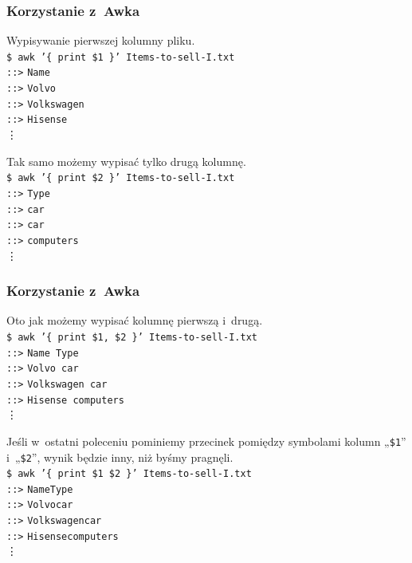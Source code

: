 \documentclass[10pt,t]{beamer}
\begin{document}
\begin{frame}
  \frametitle{Korzystanie z~Awka}


  Wypisywanie pierwszej kolumny pliku. \\
  \texttt{\$ awk '\{ print \$1 \}' Items-to-sell-I.txt} \\
  \texttt{::>} \texttt{Name} \\
  \texttt{::>} \texttt{Volvo} \\
  \texttt{::>} \texttt{Volkswagen} \\
  \texttt{::>} \texttt{Hisense} \\
  \hspace{3em} \vdots

  Tak samo możemy wypisać tylko drugą kolumnę. \\
  \texttt{\$ awk '\{ print \$2 \}' Items-to-sell-I.txt} \\
  \texttt{::>} \texttt{Type} \\
  \texttt{::>} \texttt{car} \\
  \texttt{::>} \texttt{car} \\
  \texttt{::>} \texttt{computers} \\
  \hspace{3em} \vdots

\end{frame}





\begin{frame}
  \frametitle{Korzystanie z~Awka}


  Oto jak możemy wypisać kolumnę pierwszą i~drugą. \\
  \texttt{\$ awk '\{ print \$1, \$2 \}' Items-to-sell-I.txt} \\
  \texttt{::>} \texttt{Name Type} \\
  \texttt{::>} \texttt{Volvo car} \\
  \texttt{::>} \texttt{Volkswagen car} \\
  \texttt{::>} \texttt{Hisense computers} \\
  \hspace{3em} \vdots

  Jeśli w~ostatni poleceniu pominiemy przecinek pomiędzy symbolami kolumn
  „\texttt{\$1}” i~„\texttt{\$2}”, wynik będzie inny, niż byśmy pragnęli. \\
  \texttt{\$ awk '\{ print \$1 \$2 \}' Items-to-sell-I.txt} \\
  \texttt{::>} \texttt{NameType} \\
  \texttt{::>} \texttt{Volvocar} \\
  \texttt{::>} \texttt{Volkswagencar} \\
  \texttt{::>} \texttt{Hisensecomputers} \\
  \hspace{3em} \vdots

\end{frame}
\end{document}
